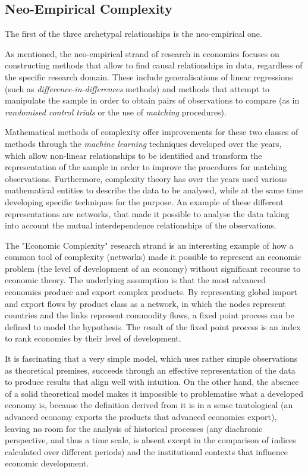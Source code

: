 \documentclass[a4paper, headings=standardclasses]{scrartcl}
\begin{document}
\subsection{Neo-Empirical Complexity}
The first of the three archetypal relationships is the neo-empirical one.

As mentioned, the neo-empirical strand of research in economics focuses on constructing methods that allow to find causal relationships in data, regardless of the specific research domain. These include generalisations of linear regressions (such as \textit{difference-in-differences} methods) and methods that attempt to manipulate the sample in order to obtain pairs of observations to compare (as in \textit{randomised control trials} or the use of \textit{matching} procedures).

Mathematical methods of complexity offer improvements for these two classes of methods through the \textit{machine learning} techniques developed over the years, which allow non-linear relationships to be identified and transform the representation of the sample in order to improve the procedures for matching observations.
Furthermore, complexity theory has over the years used various mathematical entities to describe the data to be analysed, while at the same time developing specific techniques for the purpose.
An example of these different representations are networks, that made it possible to analyse the data taking into account the mutual interdependence relationships of the observations.

The "Economic Complexity" research strand \parencite{hidalgo2021} is an interesting example of how a common tool of complexity (networks) made it possible to represent an economic problem (the level of development of an economy) without significant recourse to economic theory.
The underlying assumption is that the most advanced economies produce and export complex products.
By representing global import and export flows by product class as a network, in which the nodes represent countries and the links represent commodity flows, a fixed point process can be defined to model the hypothesis.
The result of the fixed point process is an index to rank economies by their level of development.

It is fascinating that a very simple model, which uses rather simple observations as theoretical premises, succeeds through an effective representation of the data to produce results that align well with intuition.
On the other hand, the absence of a solid theoretical model makes it impossible to problematise what a developed economy is, because the definition derived from it is in a sense tautological (an advanced economy exports the products that advanced economies export), leaving no room for the analysis of historical processes (any diachronic perspective, and thus a time scale, is absent except in the comparison of indices calculated over different periods) and the institutional contexts that influence economic development.
\end{document}

